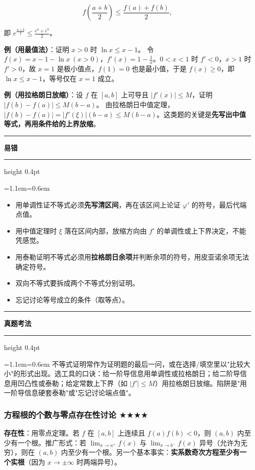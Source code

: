 \documentclass[11pt,openany,UTF8]{ctexbook}
\newcommand{\callouthead}[2]{%
  \par\addvspace{7pt}\noindent
  {\color{#1}\rule[-0.15em]{3pt}{1.05em}}\hspace{0.5em}%
  {\bfseries\color{#1}#2}\par\nobreak\vspace{-0.35em}%
  {\color{rulesep}\hrule height 0.4pt}\nobreak\vspace{0.45em}%
  \begingroup\small\setlength{\parindent}{0pt}%
  \leftskip=1.1em\rightskip=0.6em\noindent\ignorespaces}
\newcommand{\calloutend}{\par\endgroup\addvspace{7pt}}
\newenvironment{callwarn}[1]{\callouthead{warnbar}{#1}}{\calloutend}
\newenvironment{callexam}[1]{\callouthead{exambar}{#1}}{\calloutend}
\begin{document}
\[f\!\left(\frac{a+b}{2}\right)\le\frac{f(a)+f(b)}{2},\]

即 $e^{\frac{a+b}{2}}\le\frac{e^a+e^b}{2}$。

\textbf{例（用最值法）}：证明 $x>0$ 时 $\ln x\le x-1$。 令 $f(x)=x-1-\ln x\ (x>0)$，$f'(x)=1-\frac1x$。$0<x<1$ 时 $f'<0$，$x>1$ 时 $f'>0$，故 $x=1$ 是极小值点，$f(1)=0$ 也是最小值，于是 $f(x)\ge0$，即 $\ln x\le x-1$，等号仅在 $x=1$ 成立。

\textbf{例（用拉格朗日放缩）}：设 $f$ 在 $[a,b]$ 上可导且 $|f'(x)|\le M$，证明 $|f(b)-f(a)|\le M(b-a)$。 由拉格朗日中值定理，$|f(b)-f(a)|=|f'(\xi)|(b-a)\le M(b-a)$。这类题的关键是\textbf{先写出中值等式，再用条件给的上界放缩}。

\begin{callwarn}{易错}
\begin{itemize}
\item 用单调性证不等式必须\textbf{先写清区间}，再在该区间上论证 $\varphi'$ 的符号，最后代端点值。
\item 用中值定理时 $\xi$ 落在区间内部，放缩方向由 $f'$ 的单调性或上下界决定，不能凭感觉。
\item 用泰勒证明不等式必须用\textbf{拉格朗日余项}并判断余项的符号，用皮亚诺余项无法确定符号。
\item 双向不等式要拆成两个不等式分别证明。
\item 忘记讨论等号成立的条件（取等点）。
\end{itemize}
\end{callwarn}

\begin{callexam}{真题考法}
不等式证明常作为证明题的最后一问，或在选择/填空里以"比较大小"的形式出现。选工具的口诀：给一阶导信息用单调性或拉格朗日；给二阶导信息用凹凸性或泰勒；给定常数上下界（如 $|f'|\le M$）用拉格朗日放缩。陷阱是"用一阶导信息硬套泰勒"或"忘记讨论端点值"。

\end{callexam}

\subsubsection{方程根的个数与零点存在性讨论 $\bigstar$$\bigstar$$\bigstar$$\bigstar$}

\textbf{存在性}：用零点定理。若 $f$ 在 $[a,b]$ 上连续且 $f(a)f(b)<0$，则 $(a,b)$ 内至少有一个根。推广形式：若 $\lim_{x\to a^+}f(x)$ 与 $\lim_{x\to b^-}f(x)$ 异号（允许为无穷），则在 $(a,b)$ 内至少有一个根。另一个基本事实：\textbf{实系数奇次方程至少有一个实根}（因为 $x\to\pm\infty$ 时两端异号）。
\end{document}
